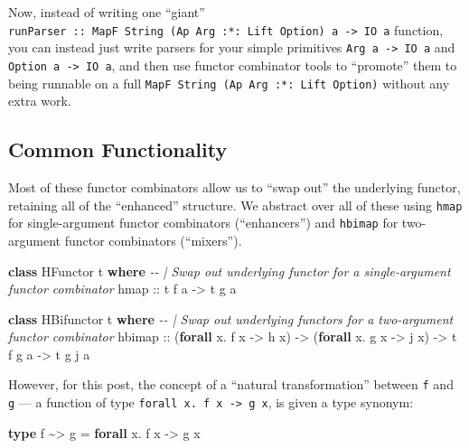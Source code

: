 \documentclass[]{article}
\newenvironment{Shaded}{}{}
\newcommand{\CommentTok}[1]{\textcolor[rgb]{0.38,0.63,0.69}{\textit{#1}}}
\newcommand{\DataTypeTok}[1]{\textcolor[rgb]{0.56,0.13,0.00}{#1}}
\newcommand{\KeywordTok}[1]{\textcolor[rgb]{0.00,0.44,0.13}{\textbf{#1}}}
\newcommand{\NormalTok}[1]{#1}
\newcommand{\OperatorTok}[1]{\textcolor[rgb]{0.40,0.40,0.40}{#1}}
\newcommand{\OtherTok}[1]{\textcolor[rgb]{0.00,0.44,0.13}{#1}}
\begin{document}
Now, instead of writing one ``giant''
\texttt{runParser\ ::\ MapF\ String\ (Ap\ Arg\ :*:\ Lift\ Option)\ a\ -\textgreater{}\ IO\ a}
function, you can instead just write parsers for your simple primitives
\texttt{Arg\ a\ -\textgreater{}\ IO\ a} and
\texttt{Option\ a\ -\textgreater{}\ IO\ a}, and then use functor combinator
tools to ``promote'' them to being runnable on a full
\texttt{MapF\ String\ (Ap\ Arg\ :*:\ Lift\ Option)} without any extra work.

\hypertarget{common-functionality}{%
\subsection{Common Functionality}\label{common-functionality}}

Most of these functor combinators allow us to ``swap out'' the underlying
functor, retaining all of the ``enhanced'' structure. We abstract over all of
these using \texttt{hmap} for single-argument functor combinators
(``enhancers'') and \texttt{hbimap} for two-argument functor combinators
(``mixers'').

\begin{Shaded}
\begin{Highlighting}[]
\KeywordTok{class} \DataTypeTok{HFunctor}\NormalTok{ t }\KeywordTok{where}
    \CommentTok{{-}{-} | Swap out underlying functor for a single{-}argument functor combinator}
\NormalTok{    hmap}
\OtherTok{        ::}\NormalTok{ t f a }\OtherTok{{-}>}\NormalTok{ t g a}

\KeywordTok{class} \DataTypeTok{HBifunctor}\NormalTok{ t }\KeywordTok{where}
    \CommentTok{{-}{-} | Swap out underlying functors for a two{-}argument functor combinator}
\NormalTok{    hbimap}
\OtherTok{        ::}\NormalTok{ (}\KeywordTok{forall}\NormalTok{ x}\OperatorTok{.}\NormalTok{ f x }\OtherTok{{-}>}\NormalTok{ h x)}
        \OtherTok{{-}>}\NormalTok{ (}\KeywordTok{forall}\NormalTok{ x}\OperatorTok{.}\NormalTok{ g x }\OtherTok{{-}>}\NormalTok{ j x)}
        \OtherTok{{-}>}\NormalTok{ t f g a}
        \OtherTok{{-}>}\NormalTok{ t g j a}
\end{Highlighting}
\end{Shaded}

However, for this post, the concept of a ``natural transformation'' between
\texttt{f} and \texttt{g} --- a function of type
\texttt{forall\ x.\ f\ x\ -\textgreater{}\ g\ x}, is given a type synonym:

\begin{Shaded}
\begin{Highlighting}[]
\KeywordTok{type}\NormalTok{ f }\OperatorTok{\textasciitilde{}>}\NormalTok{ g }\OtherTok{=} \KeywordTok{forall}\NormalTok{ x}\OperatorTok{.}\NormalTok{ f x }\OtherTok{{-}>}\NormalTok{ g x}
\end{Highlighting}
\end{Shaded}
\end{document}
